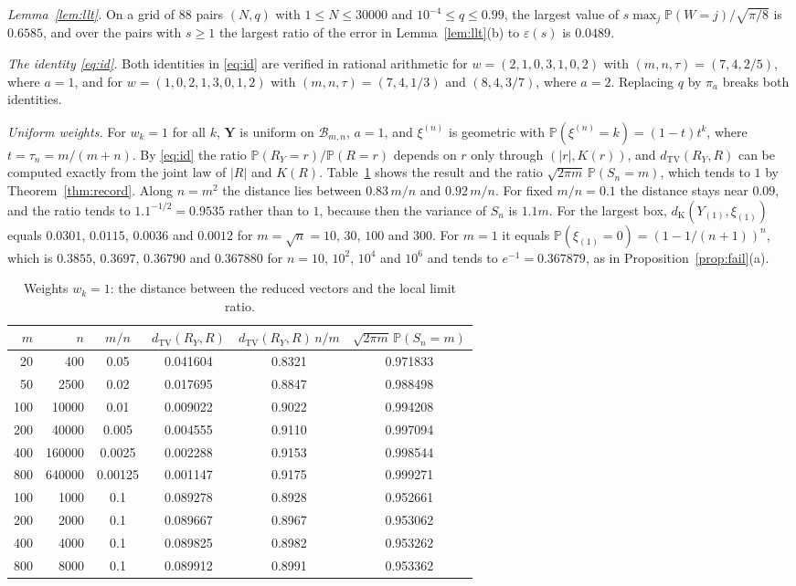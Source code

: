\documentclass[11pt]{amsart}
\theoremstyle{definition}
\theoremstyle{remark}
\numberwithin{equation}{section}
\newcommand{\Pp}{\mathbb P}
\newcommand{\cB}{\mathcal B}
\newcommand{\dtv}{d_{\mathrm{TV}}}
\newcommand{\dK}{d_{\mathrm K}}
\newcommand{\bY}{\mathbf Y}
\begin{document}
\emph{Lemma~\ref{lem:llt}.} On a grid of 88 pairs $(N,q)$ with $1\le N\le30000$ and $10^{-4}\le q\le0.99$, the largest value of $s\max_j\Pp(W=j)/\sqrt{\pi/8}$ is $0.6585$, and over the pairs with $s\ge1$ the largest ratio of the error in Lemma~\ref{lem:llt}(b) to $\varepsilon(s)$ is $0.0489$.

\emph{The identity \eqref{eq:id}.} Both identities in \eqref{eq:id} are verified in rational arithmetic for $w=(2,1,0,3,1,0,2)$ with $(m,n,\tau)=(7,4,2/5)$, where $a=1$, and for $w=(1,0,2,1,3,0,1,2)$ with $(m,n,\tau)=(7,4,1/3)$ and $(8,4,3/7)$, where $a=2$. Replacing $q$ by $\pi_a$ breaks both identities.

\emph{Uniform weights.} For $w_k=1$ for all $k$, $\bY$ is uniform on $\cB_{m,n}$, $a=1$, and $\xi^{(n)}$ is geometric with $\Pp(\xi^{(n)}=k)=(1-t)t^k$, where $t=\tau_n=m/(m+n)$. By \eqref{eq:id} the ratio $\Pp(R_Y=r)/\Pp(R=r)$ depends on $r$ only through $(|r|,K(r))$, and $\dtv(R_Y,R)$ can be computed exactly from the joint law of $|R|$ and $K(R)$. Table~\ref{tab:uniform} shows the result and the ratio $\sqrt{2\pi m}\,\Pp(S_n=m)$, which tends to $1$ by Theorem~\ref{thm:record}. Along $n=m^2$ the distance lies between $0.83\,m/n$ and $0.92\,m/n$. For fixed $m/n=0.1$ the distance stays near $0.09$, and the ratio tends to $1.1^{-1/2}=0.9535$ rather than to $1$, because then the variance of $S_n$ is $1.1m$. For the largest box, $\dK(Y_{(1)},\xi_{(1)})$ equals $0.0301$, $0.0115$, $0.0036$ and $0.0012$ for $m=\sqrt n=10$, $30$, $100$ and $300$. For $m=1$ it equals $\Pp(\xi_{(1)}=0)=(1-1/(n+1))^n$, which is $0.3855$, $0.3697$, $0.36790$ and $0.367880$ for $n=10$, $10^2$, $10^4$ and $10^6$ and tends to $e^{-1}=0.367879$, as in Proposition~\ref{prop:fail}(a).

\begin{table}[ht]
\caption{Weights $w_k=1$: the distance between the reduced vectors and the local limit ratio.}\label{tab:uniform}
\centering
\begin{tabular}{rrcccc}
\toprule
$m$&$n$&$m/n$&$\dtv(R_Y,R)$&$\dtv(R_Y,R)\,n/m$&$\sqrt{2\pi m}\,\Pp(S_n=m)$\\
\midrule
20&400&0.05&0.041604&0.8321&0.971833\\
50&2500&0.02&0.017695&0.8847&0.988498\\
100&10000&0.01&0.009022&0.9022&0.994208\\
200&40000&0.005&0.004555&0.9110&0.997094\\
400&160000&0.0025&0.002288&0.9153&0.998544\\
800&640000&0.00125&0.001147&0.9175&0.999271\\
\midrule
100&1000&0.1&0.089278&0.8928&0.952661\\
200&2000&0.1&0.089667&0.8967&0.953062\\
400&4000&0.1&0.089825&0.8982&0.953262\\
800&8000&0.1&0.089912&0.8991&0.953362\\
\bottomrule
\end{tabular}
\end{table}
\end{document}
